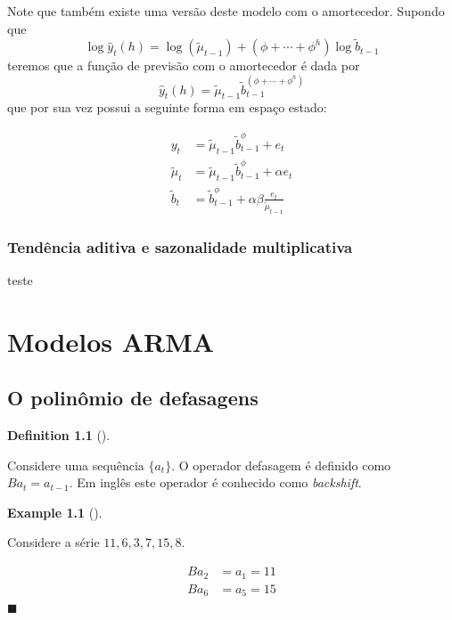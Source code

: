 \documentclass[
  letterpaper,
  DIV=11,
  numbers=noendperiod]{scrartcl}
\theoremstyle{plain}
\theoremstyle{plain}
\theoremstyle{definition}
\newtheorem{example}{Example}[chapter]
\theoremstyle{definition}
\newtheorem{definition}{Definition}[chapter]
\theoremstyle{remark}
\begin{document}
Note que também existe uma versão deste modelo com o amortecedor.
Supondo que
\[\log \hat{y}_t(h)=\log(\tilde{\mu}_{t-1})+(\phi+\cdots+\phi^h)\log\tilde{b}_{t-1}\]
teremos que a função de previsão com o amortecedor é dada por
\[\hat{y}_t(h)=\tilde{\mu}_{t-1}\tilde{b}_{t-1}^{(\phi+\cdots+\phi^h)}\]
que por sua vez possui a seguinte forma em espaço estado:

\[\begin{align}
y_t&=\tilde{\mu}_{t-1}\tilde{b}_{t-1}^\phi+e_t\\
\tilde{\mu}_t&=\tilde{\mu}_{t-1}\tilde{b}_{t-1}^\phi+\alpha e_t\\
\tilde{b}_t&=\tilde{b}_{t-1}^\phi+\alpha\beta\frac{e_t}{\tilde{\mu}_{t-1}}
\end{align}\]

\hypertarget{tenduxeancia-aditiva-e-sazonalidade-multiplicativa}{%
\subsection{Tendência aditiva e sazonalidade
multiplicativa}\label{tenduxeancia-aditiva-e-sazonalidade-multiplicativa}}

teste


\hypertarget{modelos-arma}{%
\chapter{Modelos ARMA}\label{modelos-arma}}

\hypertarget{o-polinuxf4mio-de-defasagens}{%
\section{O polinômio de defasagens}\label{o-polinuxf4mio-de-defasagens}}

\begin{definition}[]\protect\hypertarget{def-}{}\label{def-}

Considere uma sequência \(\{a_t\}\). O operador defasagem é definido
como \(Ba_t = a_{t-1}\). Em inglês este operador é conhecido como
\emph{backshift}.

\end{definition}

\begin{example}[]\protect\hypertarget{exm-example}{}\label{exm-example}

Considere a série \(11,6,3,7,15,8\).

\[\begin{align*}
     Ba_2 &= a_{1}=11\\
     B a_6& =a_5 =15
    \end{align*}\] \(\blacksquare\)

\end{example}
\end{document}
